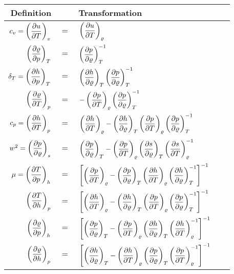 \begin{tabularx}{\linewidth}{rcl}
\toprule
Definition &       & Transformation \\
\midrule
$ c_v = \der{u}{T}{v} $ & $=$   & $ \der{u}{T}{\varrho}$ \\[12pt]
$ \der{\varrho}{p}{T} $ & $=$   & $ \der{p}{\varrho}{T}^{-1}$ \\[12pt]
$ \delta_T = \der{h}{p}{T} $ & $=$   & $ \der{h}{\varrho}{T} \der{p}{\varrho}{T}^{-1}$ \\[12pt]
$ \der{\varrho}{T}{p} $ & $=$   & $ - \der{p}{T}{\varrho}\der{p}{\varrho}{T}^{-1}$ \\[8.7pt]
\midrule[0.5pt]
$ c_p = \der{h}{T}{p} $ & $=$   & $ \der{h}{T}{\varrho} - \der{h}{\varrho}{T} \der{p}{T}{\varrho} \der{p}{\varrho}{T}^{-1}$ \\[10pt]
$ w^2 = \der{p}{\varrho}{s} $ & $=$   & $ \der{p}{\varrho}{T} - \der{p}{T}{\varrho} \der{s}{\varrho}{T} \der{s}{T}{\varrho}^{-1}\phantom{\sqrt{\der{p}{\varrho}{s}}}$ \\[8.7pt]
\midrule[0.5pt]
$ \mu = \der{T}{p}{h} $ & $=$   & $ \left[\der{p}{T}{\varrho} - \der{p}{\varrho}{T} \der{h}{T}{\varrho} \der{h}{\varrho}{T}^{-1} \right]^{-1}$ \\[10pt]
$ \der{T}{h}{p} $ & $=$   & $ \left[\der{h}{T}{\varrho} - \der{h}{\varrho}{T} \der{p}{T}{\varrho} \der{p}{\varrho}{T}^{-1} \right]^{-1}$ \\[10pt]
$ \der{\varrho}{p}{h} $ & $=$   & $ \left[\der{p}{\varrho}{T} - \der{p}{T}{\varrho} \der{h}{\varrho}{T} \der{h}{T}{\varrho}^{-1} \right]^{-1}$ \\[10pt]
$ \der{\varrho}{h}{p} $ & $=$   & $ \left[ \der{h}{\varrho}{T} - \der{h}{T}{\varrho} \der{p}{\varrho}{T} \der{p}{T}{\varrho}^{-1} \right]^{-1}$ \\[10pt]%
\bottomrule
\end{tabularx}%
